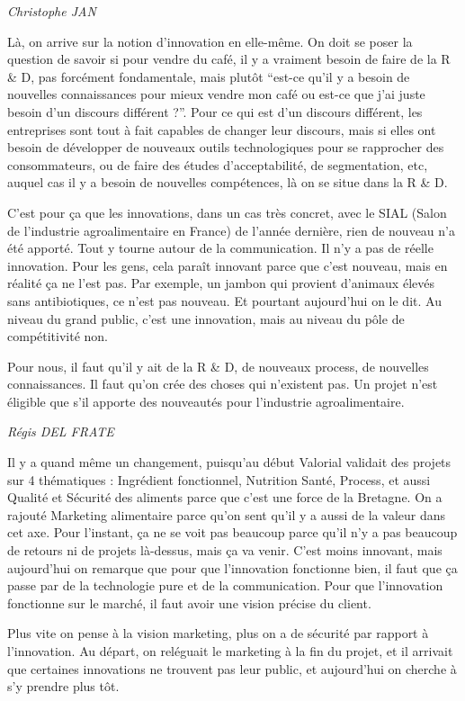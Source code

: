 \documentclass[a4paper,12pt]{report}
\begin{document}
	\emph{Christophe JAN}
	
    Là, on arrive sur la notion d’innovation en elle-même. On doit se poser la question de savoir si pour vendre du café, il y a vraiment besoin de faire de la R \& D, pas forcément fondamentale, mais plutôt “est-ce qu’il y a besoin de nouvelles connaissances pour mieux vendre mon café ou est-ce que j’ai juste besoin d’un discours différent ?”. Pour ce qui est d’un discours différent, les entreprises sont tout à fait capables de changer leur discours, mais si elles ont besoin de développer de nouveaux outils technologiques pour se rapprocher des consommateurs, ou de faire des études d’acceptabilité, de segmentation, etc, auquel cas il y a besoin de nouvelles compétences, là on se situe dans la R \& D.
   
    C’est pour ça que les innovations, dans un cas très concret, avec le SIAL (Salon de l'industrie agroalimentaire en France) de l’année dernière, rien de nouveau n’a été apporté. Tout y tourne autour de la communication. Il n’y a pas de réelle innovation. Pour les gens, cela paraît innovant parce que c’est nouveau, mais en réalité ça ne l’est pas. Par exemple, un jambon qui provient d’animaux élevés sans antibiotiques, ce n’est pas nouveau. Et pourtant aujourd’hui on le dit. Au niveau du grand public, c’est une innovation, mais au niveau du pôle de compétitivité non.
   
    Pour nous, il faut qu’il y ait de la R \& D, de nouveaux process, de nouvelles connaissances. Il faut qu’on crée des choses qui n’existent pas. Un projet n’est éligible que s’il apporte des nouveautés pour l’industrie agroalimentaire. 

	\emph{Régis DEL FRATE}
    
    Il y a quand même un changement, puisqu’au début Valorial validait des projets sur 4 thématiques : Ingrédient fonctionnel, Nutrition Santé, Process, et aussi Qualité et Sécurité des aliments parce que c’est une force de la Bretagne. On a rajouté Marketing alimentaire parce qu’on sent qu’il y a aussi de la valeur dans cet axe. Pour l’instant, ça ne se voit pas beaucoup parce qu’il n’y a pas beaucoup de retours ni de projets là-dessus, mais ça va venir. C’est moins innovant, mais aujourd’hui on remarque que pour que l’innovation fonctionne bien, il faut que ça passe par de la technologie pure et de la communication. Pour que l’innovation fonctionne sur le marché, il faut avoir une vision précise du client.
	
	Plus vite on pense à la vision marketing, plus on a de sécurité par rapport à l’innovation. Au départ, on reléguait le marketing à la fin du projet, et il arrivait que certaines innovations ne trouvent pas leur public, et aujourd’hui on cherche à s’y prendre plus tôt.
\end{document}
